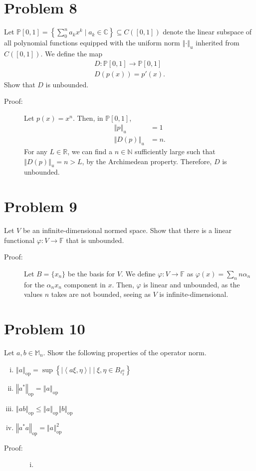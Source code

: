 \documentclass[8pt]{extarticle}
\newcommand{\N}{\mathbb{N}}
\newcommand{\R}{\mathbb{R}}
\newcommand{\C}{\mathbb{C}}
\newcommand{\iprod}[2]{\left\langle #1,#2\right\rangle}
\newcommand{\norm}[1]{\left\Vert #1\right\Vert}
\begin{document}
  \section{Problem 8}%
  Let $\mathbb{P}[0,1] = \left\{\sum_{0}^{n}a_kx^k\mid a_k\in\C\right\}\subseteq C([0,1])$ denote the linear subspace of all polynomial functions equipped with the uniform norm $\norm{\cdot}_{u}$ inherited from $C([0,1])$. We define the map
  \begin{align*}
    D:\mathbb{P}[0,1]\rightarrow \mathbb{P}[0,1]\\
    D(p(x)) = p'(x).
  \end{align*}
  Show that $D$ is unbounded.
  \begin{description}
    \item[Proof:] Let $p(x) = x^n$. Then, in $\mathbb{P}[0,1]$,
      \begin{align*}
        \norm{p}_u &= 1\\
        \norm{D(p)}_u &= n.
      \end{align*}
      For any $L\in \R$, we can find a $n\in \N$ sufficiently large such that $\norm{D(p)}_u = n > L$, by the Archimedean property. Therefore, $D$ is unbounded.
  \end{description}
  \section{Problem 9}%
  Let $V$ be an infinite-dimensional normed space. Show that there is a linear functional $\varphi: V\rightarrow \mathbb{F}$ that is unbounded.
  \begin{description}
    \item[Proof:] Let $B = \{x_n\}$ be the basis for $V$. We define $\varphi: V\rightarrow \mathbb{F}$ as $\varphi(x) = \sum_{n} n\alpha_n$ for the $\alpha_nx_n$ component in $x$. Then, $\varphi$ is linear and unbounded, as the values $n$ takes are not bounded, seeing as $V$ is infinite-dimensional.
  \end{description}
  \section{Problem 10}%
  Let $a,b\in \mathbb{M}_{n}$. Show the following properties of the operator norm.
  \begin{enumerate}[(i)]
    \item $\norm{a}_{\text{op}} = \sup\left\{|\iprod{a\xi}{\eta}|\mid \xi,\eta\in B_{\ell_{2}^{n}} \right\}$
    \item $\norm{a^{\ast}}_{\text{op}} = \norm{a}_{\text{op}}$
    \item $\norm{ab}_{\text{op}} \leq \norm{a}_{\text{op}}\norm{b}_{\text{op}}$
    \item $\norm{a^{\ast}a}_{\text{op}} = \norm{a}^{2}_{\text{op}}$
  \end{enumerate}
  \begin{description}
    \item[Proof:]\hfill
      \begin{enumerate}[(i)]
        \item 
      \end{enumerate}
  \end{description}
\end{document}
